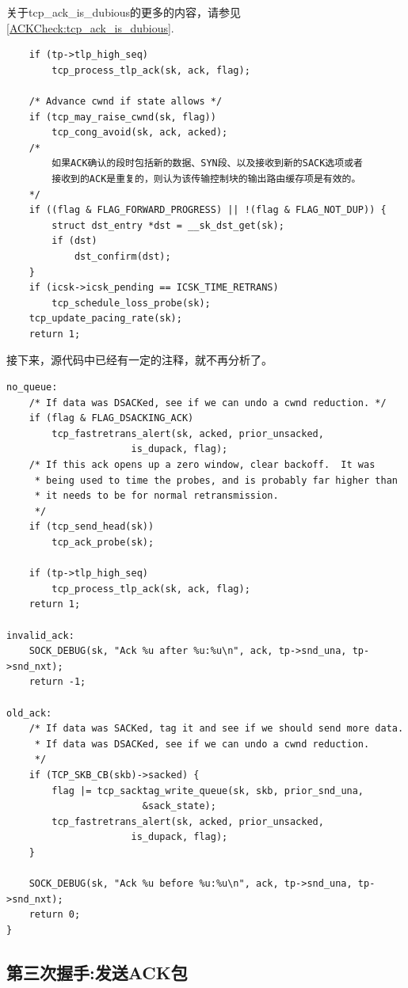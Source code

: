 	关于tcp\_ack\_is\_dubious的更多的内容，请参见\ref{ACKCheck:tcp_ack_is_dubious}.

\begin{verbatim}
	if (tp->tlp_high_seq)
		tcp_process_tlp_ack(sk, ack, flag);

	/* Advance cwnd if state allows */
	if (tcp_may_raise_cwnd(sk, flag))
		tcp_cong_avoid(sk, ack, acked);
	/*
		如果ACK确认的段时包括新的数据、SYN段、以及接收到新的SACK选项或者
		接收到的ACK是重复的，则认为该传输控制块的输出路由缓存项是有效的。
	*/
	if ((flag & FLAG_FORWARD_PROGRESS) || !(flag & FLAG_NOT_DUP)) {
		struct dst_entry *dst = __sk_dst_get(sk);
		if (dst)
			dst_confirm(dst);
	}
	if (icsk->icsk_pending == ICSK_TIME_RETRANS)
		tcp_schedule_loss_probe(sk);
	tcp_update_pacing_rate(sk);
	return 1;
\end{verbatim}

	接下来，源代码中已经有一定的注释，就不再分析了。
\begin{verbatim}
no_queue:
	/* If data was DSACKed, see if we can undo a cwnd reduction. */
	if (flag & FLAG_DSACKING_ACK)
		tcp_fastretrans_alert(sk, acked, prior_unsacked,
				      is_dupack, flag);
	/* If this ack opens up a zero window, clear backoff.  It was
	 * being used to time the probes, and is probably far higher than
	 * it needs to be for normal retransmission.
	 */
	if (tcp_send_head(sk))
		tcp_ack_probe(sk);

	if (tp->tlp_high_seq)
		tcp_process_tlp_ack(sk, ack, flag);
	return 1;

invalid_ack:
	SOCK_DEBUG(sk, "Ack %u after %u:%u\n", ack, tp->snd_una, tp->snd_nxt);
	return -1;

old_ack:
	/* If data was SACKed, tag it and see if we should send more data.
	 * If data was DSACKed, see if we can undo a cwnd reduction.
	 */
	if (TCP_SKB_CB(skb)->sacked) {
		flag |= tcp_sacktag_write_queue(sk, skb, prior_snd_una,
						&sack_state);
		tcp_fastretrans_alert(sk, acked, prior_unsacked,
				      is_dupack, flag);
	}

	SOCK_DEBUG(sk, "Ack %u before %u:%u\n", ack, tp->snd_una, tp->snd_nxt);
	return 0;
}
\end{verbatim} 
	\subsection{第三次握手:发送ACK包}
		\label{Client:send_ack}
